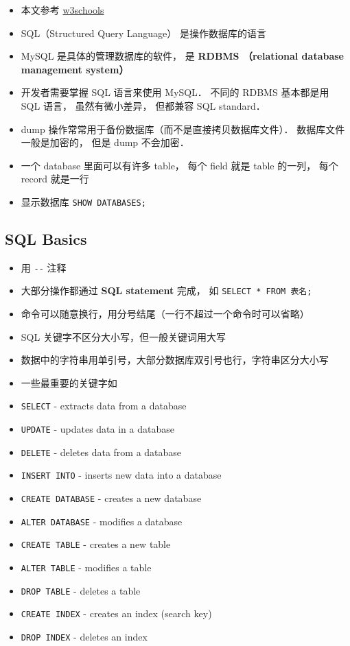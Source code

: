 
\begin{issues}
\issueDraft
\end{issues}

\begin{itemize}
\item 本文参考 \href{https://www.w3schools.com/sql/default.asp}{w3schools}
\item SQL（Structured Query Language） 是操作数据库的语言
\item MySQL 是具体的管理数据库的软件， 是 \textbf{RDBMS （relational database management system）}
\item 开发者需要掌握 SQL 语言来使用 MySQL． 不同的 RDBMS 基本都是用 SQL 语言， 虽然有微小差异， 但都兼容 SQL standard．
\item dump 操作常常用于备份数据库（而不是直接拷贝数据库文件）． 数据库文件一般是加密的， 但是 dump 不会加密．
\item 一个 database 里面可以有许多 table， 每个 field 就是 table 的一列， 每个 record 就是一行
\item 显示数据库 \verb`SHOW DATABASES;`
\end{itemize}

\subsection{SQL Basics}
\begin{itemize}
\item 用 \verb|--| 注释
\item 大部分操作都通过 \textbf{SQL statement} 完成， 如 \verb`SELECT * FROM 表名;`
\item 命令可以随意换行，用分号结尾（一行不超过一个命令时可以省略）
\item SQL 关键字不区分大小写，但一般关键词用大写
\item 数据中的字符串用单引号，大部分数据库双引号也行，字符串区分大小写
\item 一些最重要的关键字如
\item \verb`SELECT` - extracts data from a database
\item \verb`UPDATE` - updates data in a database
\item \verb`DELETE` - deletes data from a database
\item \verb`INSERT INTO` - inserts new data into a database
\item \verb`CREATE DATABASE` - creates a new database
\item \verb`ALTER DATABASE` - modifies a database
\item \verb`CREATE TABLE` - creates a new table
\item \verb`ALTER TABLE` - modifies a table
\item \verb`DROP TABLE` - deletes a table
\item \verb`CREATE INDEX` - creates an index (search key)
\item \verb`DROP INDEX` - deletes an index
\end{itemize}

